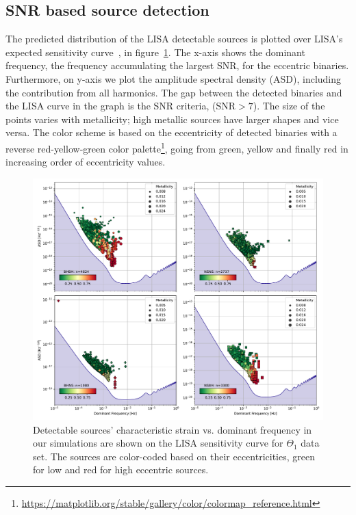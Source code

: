 \documentclass[twocolumn, twocolappendix]{aastex63}
\begin{document}
    \subsection{SNR based source detection}
    \label{subsec:snr-based-source-detection}
    The predicted distribution of the LISA detectable sources is plotted over LISA's expected sensitivity curve~\citep{Robson2019}, in figure~\ref{fig:alldcosnrplotting}.
    The x-axis shows the dominant frequency, the frequency accumulating the largest SNR, for the eccentric binaries.
    Furthermore, on y-axis we plot the amplitude spectral density (ASD), including the contribution from all harmonics.
    The gap between the detected binaries and the LISA curve in the graph is the SNR criteria, ($\text{SNR}>7$).
    The size of the points varies with metallicity; high metallic sources have larger shapes and vice versa.
    The color scheme is based on the eccentricity of detected binaries with a reverse red-yellow-green color palette\footnote{\url{https://matplotlib.org/stable/gallery/color/colormap_reference.html}}, going from green, yellow and finally red in increasing order of eccentricity values.

    \begin{figure}[!htb]%
        \centering
        \includegraphics[width=\columnwidth]{analysis_data/004__images_for_latex/dco_typewise_snr}
        \caption{Detectable sources' characteristic strain vs. dominant frequency in our simulations are shown on the LISA sensitivity curve for $\Theta_1$ data set. The sources are color-coded based on their eccentricities, green for low and red for high eccentric sources.}
        \label{fig:alldcosnrplotting}
    \end{figure}
\end{document}
